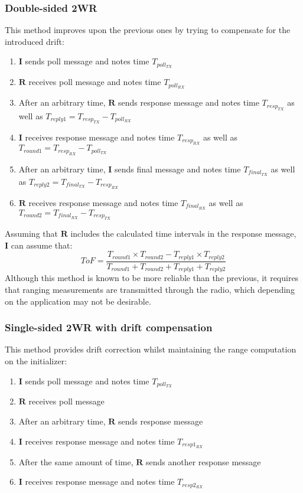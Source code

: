 \subsubsection{Double-sided 2WR}
This method improves upon the previous ones by trying to compensate for the introduced drift:
\begin{enumerate}
    \item \(\mathbf{I}\) sends poll message and notes time \(T_{poll_{TX}}\)
    \item \(\mathbf{R}\) receives poll message and notes time \(T_{poll_{RX}}\)
    \item After an arbitrary time, \(\mathbf{R}\) sends response message and notes time \(T_{resp_{TX}}\) as well as \(T_{reply1} = T_{resp_{TX}} - T_{poll_{RX}}\)
    \item \(\mathbf{I}\) receives response message and notes time \(T_{resp_{RX}}\) as well as \(T_{round1} = T_{resp_{RX}} - T_{poll_{TX}}\)
    \item After an arbitrary time, \(\mathbf{I}\) sends final message and notes time \(T_{final_{TX}}\) as well as \(T_{reply2} = T_{final_{TX}} - T_{resp_{RX}}\)
    \item \(\mathbf{R}\) receives response message and notes time \(T_{final_{RX}}\) as well as \(T_{round2} = T_{final_{RX}} - T_{resp_{TX}}\)
\end{enumerate}
Assuming that \(\mathbf{R}\) includes the calculated time intervals in the response message, \(\mathbf{I}\) can assume that:
\begin{equation}
    \textit{ToF} = \frac{T_{round1} \times T_{round2} - T_{reply1} \times T_{reply2}}{T_{round1} + T_{round2} + T_{reply1} + T_{reply2}}
\end{equation}
Although this method is known to be more reliable than the previous, it requires that ranging measurements are transmitted through the radio, which depending on the application may not be desirable.

\subsubsection{Single-sided 2WR with drift compensation}
This method provides drift correction whilst maintaining the range computation on the initializer:
\begin{enumerate}
    \item \(\mathbf{I}\) sends poll message and notes time \(T_{poll_{TX}}\)
    \item \(\mathbf{R}\) receives poll message
    \item After an arbitrary time, \(\mathbf{R}\) sends response message
    \item \(\mathbf{I}\) receives response message and notes time \(T_{resp1_{RX}}\)
    \item After the same amount of time, \(\mathbf{R}\) sends another response message
    \item \(\mathbf{I}\) receives response message and notes time \(T_{resp2_{RX}}\)
\end{enumerate}


